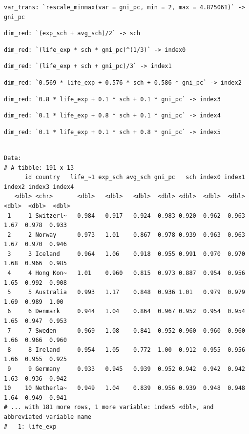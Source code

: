 \documentclass[
]{article}
\begin{document}
\begin{verbatim}
var_trans: `rescale_minmax(var = gni_pc, min = 2, max = 4.875061)` -> gni_pc
\end{verbatim}

\begin{verbatim}
dim_red: `(exp_sch + avg_sch)/2` -> sch
\end{verbatim}

\begin{verbatim}
dim_red: `(life_exp * sch * gni_pc)^(1/3)` -> index0
\end{verbatim}

\begin{verbatim}
dim_red: `(life_exp + sch + gni_pc)/3` -> index1
\end{verbatim}

\begin{verbatim}
dim_red: `0.569 * life_exp + 0.576 * sch + 0.586 * gni_pc` -> index2
\end{verbatim}

\begin{verbatim}
dim_red: `0.8 * life_exp + 0.1 * sch + 0.1 * gni_pc` -> index3
\end{verbatim}

\begin{verbatim}
dim_red: `0.1 * life_exp + 0.8 * sch + 0.1 * gni_pc` -> index4
\end{verbatim}

\begin{verbatim}
dim_red: `0.1 * life_exp + 0.1 * sch + 0.8 * gni_pc` -> index5
\end{verbatim}

\begin{verbatim}

Data: 
# A tibble: 191 x 13
      id country   life_~1 exp_sch avg_sch gni_pc   sch index0 index1 index2 index3 index4
   <dbl> <chr>       <dbl>   <dbl>   <dbl>  <dbl> <dbl>  <dbl>  <dbl>  <dbl>  <dbl>  <dbl>
 1     1 Switzerl~   0.984   0.917   0.924  0.983 0.920  0.962  0.963   1.67  0.978  0.933
 2     2 Norway      0.973   1.01    0.867  0.978 0.939  0.963  0.963   1.67  0.970  0.946
 3     3 Iceland     0.964   1.06    0.918  0.955 0.991  0.970  0.970   1.68  0.966  0.985
 4     4 Hong Kon~   1.01    0.960   0.815  0.973 0.887  0.954  0.956   1.65  0.992  0.908
 5     5 Australia   0.993   1.17    0.848  0.936 1.01   0.979  0.979   1.69  0.989  1.00 
 6     6 Denmark     0.944   1.04    0.864  0.967 0.952  0.954  0.954   1.65  0.947  0.953
 7     7 Sweden      0.969   1.08    0.841  0.952 0.960  0.960  0.960   1.66  0.966  0.960
 8     8 Ireland     0.954   1.05    0.772  1.00  0.912  0.955  0.956   1.66  0.955  0.925
 9     9 Germany     0.933   0.945   0.939  0.952 0.942  0.942  0.942   1.63  0.936  0.942
10    10 Netherla~   0.949   1.04    0.839  0.956 0.939  0.948  0.948   1.64  0.949  0.941
# ... with 181 more rows, 1 more variable: index5 <dbl>, and abbreviated variable name
#   1: life_exp
\end{verbatim}
\end{document}
